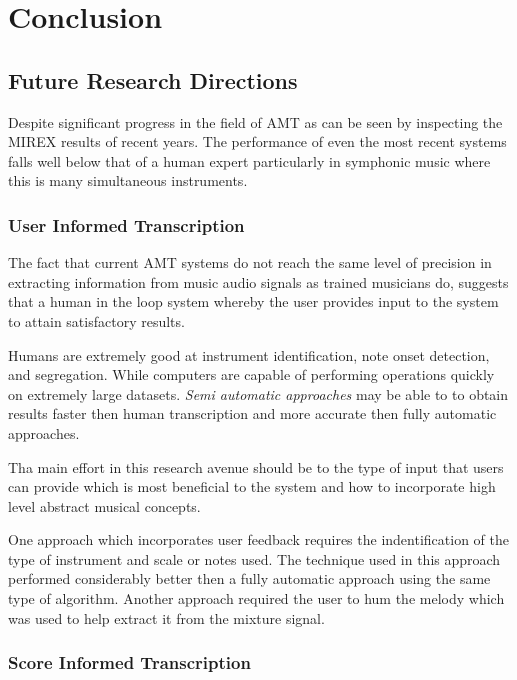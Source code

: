 \chapter{Conclusion}
\label{ch:concl}

\section{Future Research Directions}

Despite significant progress in the field of \ac{AMT} as can be seen by inspecting
the \ac{MIREX} results \cite{MIREX} of recent years. The performance of even the most
recent systems falls well below that of a human expert particularly in symphonic
music where this is many simultaneous instruments. \cite{roadmap-MIR:Serra2013}

\subsection{User Informed Transcription}

The fact that current \ac{AMT} systems do not reach the same level of precision in
extracting information from music audio signals as trained musicians do,
suggests that a human in the loop system whereby the user provides input to the
system to attain satisfactory results.

Humans are extremely good at instrument identification, note onset detection,
and segregation. While computers are capable of performing operations quickly on
extremely large datasets. \cite{ISMIR-tut:Benetos} \emph{Semi automatic
    approaches} may be able to to obtain results faster then human transcription and
more accurate then fully automatic approaches. \cite{ISMIR-tut:Benetos}

Tha main effort in this research avenue should be to the type of input that
users can provide which is most beneficial to the system and how to incorporate
high level abstract musical concepts.

One approach which incorporates user feedback requires the indentification of
the type of instrument and scale or notes used. \cite{user-inform:Kirchoff2012}
The technique used in this approach performed considerably better then a fully
automatic approach using the same type of algorithm. Another approach required
the user to hum the melody which was used to help extract it from the mixture
signal. \cite{humming2009:Smaragdis}

\subsection{Score Informed Transcription}

